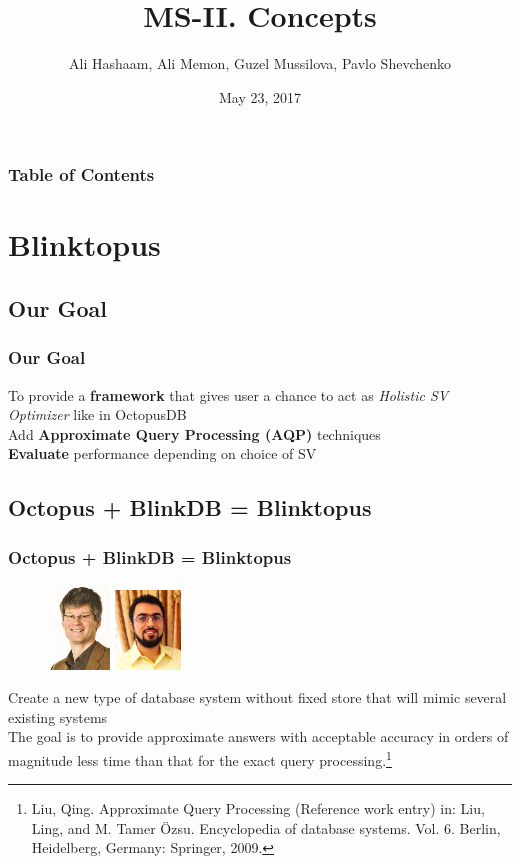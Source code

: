 \documentclass{beamer}
\title{MS-II. Concepts}
\author{Ali Hashaam, Ali Memon, Guzel Mussilova, Pavlo Shevchenko}
\date{May 23, 2017}
\institute{Scientific Project: Databases for Multi-Dimensional Data, Genomics and Modern Hardware}
\begin{document}
\begin{frame}[plain]
 \titlepage
\end{frame}

\begin{frame}
\frametitle{Table of Contents}
\tableofcontents 
\end{frame}

\section{Blinktopus}

\subsection{Our Goal}
\begin{frame}
\frametitle{Our Goal}
To provide a \textbf{framework} that gives user a chance to act as \textit{Holistic SV Optimizer} like in OctopusDB \\
Add \textbf{Approximate Query Processing (AQP)} techniques\\
\textbf{Evaluate} performance depending on choice of SV
\end{frame}

\subsection{Octopus + BlinkDB = Blinktopus}
\begin{frame}
\frametitle{Octopus + BlinkDB = Blinktopus}
\begin{figure}
\includegraphics[width=1.65cm]{img/jensdittrich.jpg}
\vspace{0.25 cm}
\includegraphics[width=1.75cm]{img/Mozafaribarzan.JPG}
\end{figure}
Create a new type of database system without fixed store that will mimic several existing systems\\
\vspace{2.2 cm}
The goal is to provide approximate answers with acceptable accuracy in orders of magnitude less time than that for the exact query processing.\footnote{\tiny Liu, Qing. Approximate Query Processing (Reference work entry) in: Liu, Ling, and M. Tamer Özsu. Encyclopedia of database systems. Vol. 6. Berlin, Heidelberg, Germany: Springer, 2009.}\\
\end{frame}
\end{document}
